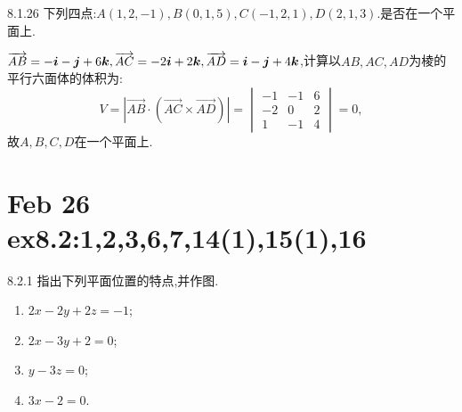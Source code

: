 \begin{exercise}{8.1.26}
    下列四点:$A(1,2,-1),B(0,1,5),C(-1,2,1),D(2,1,3)$.是否在一个平面上.
\end{exercise}

\begin{solution}
    $\overrightarrow{AB} = -\bm{i} - \bm{j} + 6\bm{k}, \overrightarrow{AC} = -2\bm{i} + 2\bm{k}, \overrightarrow{AD} = \bm{i} - \bm{j} + 4\bm{k}$,计算以$AB,AC,AD$为棱的平行六面体的体积为:
    $$
    V = |\overrightarrow{AB} \cdot (\overrightarrow{AC} \times \overrightarrow{AD})| = 
    \begin{vmatrix}
        -1 & -1 & 6 \\
        -2 & 0 & 2 \\
        1 & -1 & 4
    \end{vmatrix} = 0,
    $$故$A,B,C,D$在一个平面上.
\end{solution}

\section{Feb 26 ex8.2:1,2,3,6,7,14(1),15(1),16}

\begin{exercise}{8.2.1}
    指出下列平面位置的特点,并作图.\begin{multicols}{2}
        \begin{enumerate}
            \item $2x - 2y + 2z = -1$;
            \item $2x - 3y + 2 = 0$;
            \item $y-3z = 0$;
            \item $3x -2 = 0$.
        \end{enumerate}
    \end{multicols}
    
\end{exercise}

